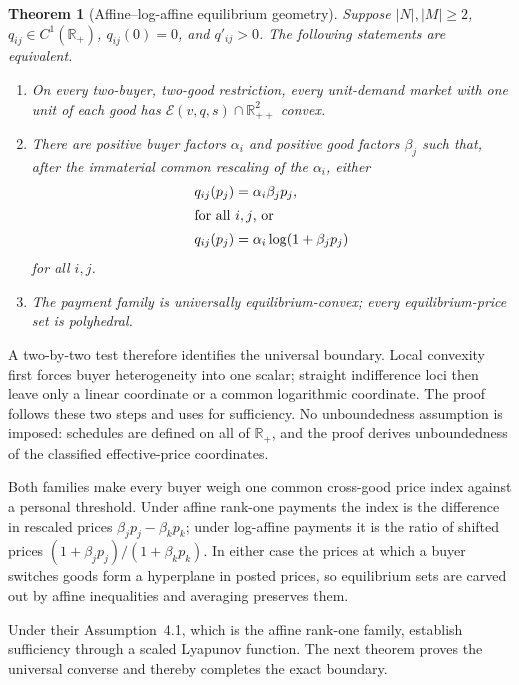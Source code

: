 \documentclass[11pt,a4paper,fleqn]{article}
\theoremstyle{plain}
\newtheorem{theorem}{Theorem}
\theoremstyle{definition}
\newcommand{\R}{\mathbb{R}}
\newcommand{\Ecal}{\mathcal{E}}
\begin{document}
\begin{theorem}[Affine--log-affine equilibrium geometry]\label{thm:geometry}
Suppose $|N|,|M|\ge2$, $q_{ij}\in C^1(\R_+)$, $q_{ij}(0)=0$, and $q'_{ij}>0$. The following statements are equivalent.
\begin{enumerate}[label=(\roman*),leftmargin=2.2em]
\item On every two-buyer, two-good restriction, every unit-demand market with one unit of each good has $\Ecal(v,q,s)\cap\R_{++}^2$ convex.
\item There are positive buyer factors $\alpha_i$ and positive good factors $\beta_j$ such that, after the immaterial common rescaling of the $\alpha_i$, either
\begin{align}
q_{ij}(p_j)&=\alpha_i\beta_jp_j, \label{eq:affine-family}\\
\intertext{for all $i,j$, or}
q_{ij}(p_j)&=\alpha_i\log(1+\beta_jp_j) \label{eq:log-family}
\end{align}
for all $i,j$.
\item The payment family is universally equilibrium-convex; every equilibrium-price set is polyhedral.
\end{enumerate}
\end{theorem}

A two-by-two test therefore identifies the universal boundary. Local convexity first forces buyer heterogeneity into one scalar; straight indifference loci then leave only a linear coordinate or a common logarithmic coordinate. The proof follows these two steps and uses  for sufficiency. No unboundedness assumption is imposed: schedules are defined on all of $\R_+$, and the proof derives unboundedness of the classified effective-price coordinates.

Both families make every buyer weigh one common cross-good price index against a personal threshold. Under affine rank-one payments the index is the difference in rescaled prices $\beta_jp_j-\beta_kp_k$; under log-affine payments it is the ratio of shifted prices $(1+\beta_jp_j)/(1+\beta_kp_k)$. In either case the prices at which a buyer switches goods form a hyperplane in posted prices, so equilibrium sets are carved out by affine inequalities and averaging preserves them.

Under their Assumption~4.1, which is the affine rank-one family, \citet[Theorem~6.4]{okisato2026} establish sufficiency through a scaled Lyapunov function. The next theorem proves the universal converse and thereby completes the exact boundary.
\end{document}
